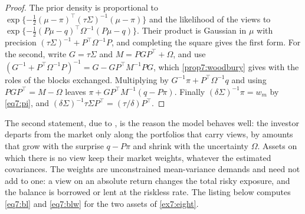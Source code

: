 \begin{chapterrefs}
\begin{proof}
The prior density is proportional to $\exp\{-\frac12(\mu-\pi)^\top(\tau\Sigma)^{-1}(\mu-\pi)\}$ and the
likelihood of the views to $\exp\{-\frac12(P\mu-q)^\top\Omega^{-1}(P\mu-q)\}$. Their product is Gaussian in
$\mu$ with precision $(\tau\Sigma)^{-1}+P^\top\Omega^{-1}P$, and completing the square gives the first
form. For the second, write $G=\tau\Sigma$ and $M=PGP^\top+\Omega$, and use
$(G^{-1}+P^\top\Omega^{-1}P)^{-1}=G-GP^\top M^{-1}PG$, which \cref{prop7:woodbury} gives with the roles
of the blocks exchanged. Multiplying by $G^{-1}\pi+P^\top\Omega^{-1}q$ and using $PGP^\top=M-\Omega$ leaves
$\pi+GP^\top M^{-1}(q-P\pi)$. Finally $(\delta\Sigma)^{-1}\pi=w_m$ by \cref{eq7:pi}, and
$(\delta\Sigma)^{-1}\tau\Sigma P^\top=(\tau/\delta)P^\top$.
\end{proof}

The second statement, due to \textcite{he2002}, is the reason the model behaves well: the investor
departs from the market only along the portfolios that carry views, by amounts that grow with the
surprise $q-P\pi$ and shrink with the uncertainty $\Omega$. Assets on which there is no view keep their
market weights, whatever the estimated covariances. The weights are unconstrained mean-variance demands
and need not add to one: a view on an absolute return changes the total risky exposure, and the
balance is borrowed or lent at the riskless rate. The listing below computes \cref{eq7:bl} and
\cref{eq7:blw} for the two assets of \cref{ex7:eight}.



\end{chapterrefs}
